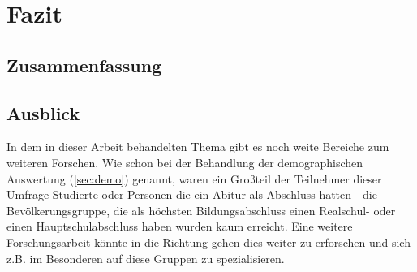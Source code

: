 %
% 

\chapter{Fazit}


\section{Zusammenfassung}

\section{Ausblick}
In dem in dieser Arbeit behandelten Thema gibt es noch weite Bereiche zum weiteren Forschen. Wie schon bei der Behandlung der demographischen Auswertung (\ref{sec:demo}) genannt, waren ein Großteil der Teilnehmer dieser Umfrage Studierte oder Personen die ein Abitur als Abschluss hatten - die Bevölkerungsgruppe, die als höchsten Bildungsabschluss einen Realschul- oder einen Hauptschulabschluss haben wurden kaum erreicht. Eine weitere Forschungsarbeit könnte in die Richtung gehen dies weiter zu erforschen und sich z.B. im Besonderen auf diese Gruppen zu spezialisieren.

